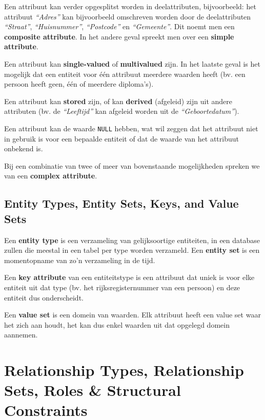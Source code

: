 Een attribuut kan verder opgesplitst worden in deelattributen, bijvoorbeeld: het attribuut \textit{``Adres''} kan bijvoorbeeld omschreven worden door de deelattributen \textit{``Straat''}, \textit{``Huisnummer''}, \textit{``Postcode''} en \textit{``Gemeente''}. Dit noemt men een \textbf{composite attribute}. In het andere geval spreekt men over een \textbf{simple attribute}.

Een attribuut kan \textbf{single-valued} of \textbf{multivalued} zijn. In het laatste geval is het mogelijk dat een entiteit voor \'e\'en attribuut meerdere waarden heeft (bv. een persoon heeft geen, \'e\'en of meerdere diploma's).

Een attribuut kan \textbf{stored} zijn, of kan \textbf{derived} (afgeleid) zijn uit andere attributen (bv. de \textit{``Leeftijd''} kan afgeleid worden uit de \textit{``Geboortedatum''}).

Een attribuut kan de waarde \texttt{NULL} hebben, wat wil zeggen dat het attribuut niet in gebruik is voor een bepaalde entiteit of dat de waarde van het attribuut onbekend is.

Bij een combinatie van twee of meer van bovenstaande mogelijkheden spreken we van een \textbf{complex attribute}.

\subsection{Entity Types, Entity Sets, Keys, and Value Sets}
Een \textbf{entity type} is een verzameling van gelijksoortige entiteiten, in een database zullen die meestal in een tabel per type worden verzameld. Een \textbf{entity set} is een momentopname van zo'n verzameling in de tijd.

Een \textbf{key attribute} van een entiteitstype is een attribuut dat uniek is voor elke entiteit uit dat type (bv. het rijksregisternummer van een persoon) en deze entiteit dus onderscheidt.

Een \textbf{value set} is een domein van waarden. Elk attribuut heeft een value set waar het zich aan houdt, het kan dus enkel waarden uit dat opgelegd domein aannemen.



\section{Relationship Types, Relationship Sets, Roles \& Structural Constraints}
